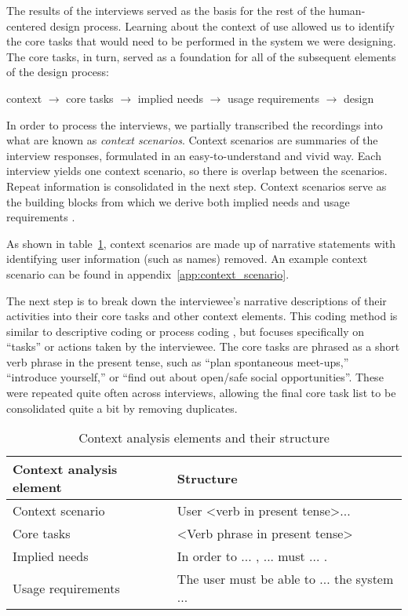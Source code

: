 The results of the interviews served as the basis for the rest of the human-centered design process. Learning about the context of use allowed us to identify the core tasks that would need to be performed in the system we were designing. The core tasks, in turn, served as a foundation for all of the subsequent elements of the design process:

\begin{center}
{\small
    context $\rightarrow$
    core tasks $\rightarrow$
    implied needs $\rightarrow$
    usage requirements $\rightarrow$
    design
}
\end{center}

In order to process the interviews, we partially transcribed the recordings into what are known as \textit{context scenarios}. Context scenarios are summaries of the interview responses, formulated in an easy-to-understand and vivid way. Each interview yields one context scenario, so there is overlap between the scenarios. Repeat information is consolidated in the next step. Context scenarios serve as the building blocks from which we derive both implied needs and usage requirements \cite{riedemann_context_2018}.

As shown in table~\ref{tab:context_analysis_elements}, context scenarios are made up of narrative statements with identifying user information (such as names) removed. An example context scenario can be found in appendix~\ref{app:context_scenario}.

The next step is to break down the interviewee's narrative descriptions of their activities into their core tasks and other context elements. This coding method is similar to descriptive coding or process coding \cite{saldana_coding_2009}, but focuses specifically on ``tasks'' or actions taken by the interviewee. The core tasks are phrased as a short verb phrase in the present tense, such as ``plan spontaneous meet-ups,'' ``introduce yourself,'' or ``find out about open/safe social opportunities''. These were repeated quite often across interviews, allowing the final core task list to be consolidated quite a bit by removing duplicates.

\begin{table}[ht]
\centering
\begin{tabular}{|l|l|}
\hline
\rowcolor{lightgray}
\textbf{Context analysis element} & \textbf{Structure}                                     \\ \hline
Context scenario                  & User \textless{}verb in present tense\textgreater{}... \\ \hline
Core tasks                        & \textless{}Verb phrase in present tense\textgreater{}  \\ \hline
Implied needs                     & In order to ... , ... must ... .                       \\ \hline
Usage requirements                & The user must be able to ... the system ...            \\ \hline
\end{tabular}
\caption{Context analysis elements and their structure}
\label{tab:context_analysis_elements}
\end{table}

